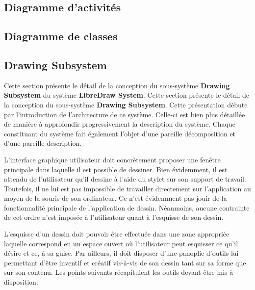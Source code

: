 \documentclass[11pt,a4paper,oldfontcommands]{memoir}
\begin{document}
\newpage

\subsection{Diagramme d'activités}

\subsection{Diagramme de classes}

\newpage

\subsection{Drawing Subsystem}

Cette section présente le détail de la conception du sous-système \textbf{Drawing Subsystem} du système \textbf{LibreDraw System}. Cette section présente le détail de la conception du sous-système \textbf{Drawing Subsystem}. Cette présentation débute par l'introduction de l'architecture de ce système. Celle-ci est bien plus détaillée de manière à approfondir progressivement la description du système. Chaque constituant du système fait également l'objet d'une pareille décomposition et d'une pareille description.

L'interface graphique utilisateur doit concrètement proposer une fenêtre principale dans laquelle il est possible de dessiner. Bien évidemment, il est attendu de l'utilisateur qu'il dessine à l'aide du stylet sur son support de travail. Toutefois, il ne lui est pas impossible de travailler directement sur l'application au moyen de la souris de son ordinateur. Ce n'est évidemment pas jouir de la fonctionnalité principale de l'application de dessin. Néanmoins, aucune contrainte de cet ordre n'est imposée à l'utilisateur quant à l'esquisse de son dessin.

L'esquisse d'un dessin doit pouvoir être effectuée dans une zone appropriée laquelle correspond en un espace ouvert où l'utilisateur peut esquisser ce qu'il désire et ce, à sa guise. Par ailleurs, il doit disposer d'une panoplie d'outils lui permettant d'être inventif et créatif vis-à-vis de son dessin tant sur sa forme que sur son contenu. Les points suivants récapitulent les outils devant être mis à disposition:
\end{document}
